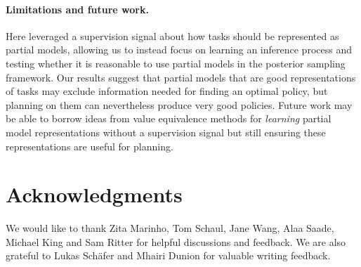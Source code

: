 \documentclass[sigconf]{aamas}
\begin{document}
\paragraph{Limitations and future work.} Here leveraged a supervision signal about how tasks should be represented as partial models, allowing us to instead focus on learning an inference process and testing whether it is reasonable to use partial models in the posterior sampling framework. Our results suggest that partial models that are good representations of tasks may exclude information needed for finding an optimal policy, but planning on them can nevertheless produce very good policies. Future work may be able to borrow ideas from value equivalence methods for \textit{learning} partial model representations without a supervision signal but still ensuring these representations are useful for planning.
\section*{Acknowledgments}
We would like to thank Zita Marinho, Tom Schaul, Jane Wang, Alaa Saade, Michael King and Sam Ritter for helpful discussions and feedback. We are also grateful to Lukas Schäfer and Mhairi Dunion for valuable writing feedback.


\newpage
\appendix
\onecolumn
\end{document}
